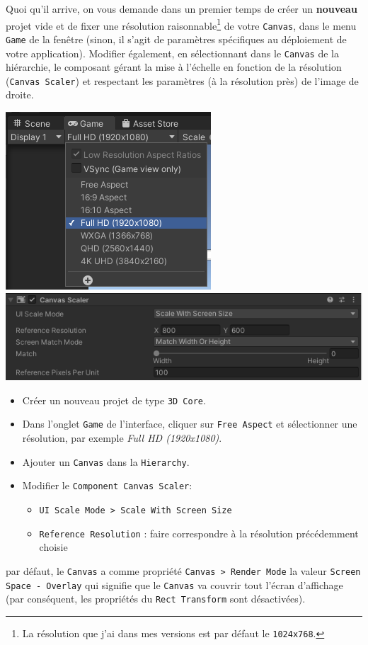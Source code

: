 \documentclass[a4paper,10pt]{article}
\newenvironment{solution}%
{\begin{tcolorbox}[breakable,colback=red!5!white,colframe=red!75!black,title=Solution]}%
{\end{tcolorbox}}
\begin{document}
Quoi qu'il arrive, on vous demande dans un premier temps de créer un \textbf{nouveau} projet vide et de fixer une résolution raisonnable\footnote{La résolution que j'ai dans mes versions est par défaut le \texttt{1024x768}.} de votre \texttt{Canvas}, dans le menu \texttt{Game} de la fenêtre (sinon, il s'agit de paramètres spécifiques au déploiement de votre application). Modifier également, en sélectionnant dans le \texttt{Canvas} de la hiérarchie, le composant gérant la mise à l'échelle en fonction de la résolution (\texttt{Canvas Scaler}) et respectant les paramètres (à la résolution près) de l'image de droite.

\begin{center}
\hfill	\includegraphics[width=0.3\linewidth]{rc/unity_set_ui_resolution_game}%
\hfill	\includegraphics[width=0.6\linewidth]{rc/unity_set_ui_resolution_canvas_scaler}%
\hfill
\end{center}

\ifversionenseignant
\begin{solution}
	\begin{itemize}
		\item Créer un nouveau projet de type \texttt{3D Core}.
		\item Dans l'onglet \texttt{Game} de l'interface, cliquer sur \texttt{Free Aspect} et sélectionner une résolution, par exemple \textit{Full HD (1920x1080)}.
		\item Ajouter un \texttt{Canvas} dans la \texttt{Hierarchy}.
		\item Modifier le \texttt{Component Canvas Scaler}:
		\begin{itemize}
			\item \texttt{UI Scale Mode > Scale With Screen Size}
			\item \texttt{Reference Resolution} : faire correspondre à la résolution précédemment choisie
		\end{itemize}
	\end{itemize}

par défaut, le \texttt{Canvas} a comme propriété \texttt{Canvas > Render Mode} la valeur \texttt{Screen Space - Overlay} qui signifie que le \texttt{Canvas} va couvrir tout l'écran d'affichage (par conséquent, les propriétés du \texttt{Rect Transform} sont désactivées).
\end{solution}
\fi 
\end{document}
